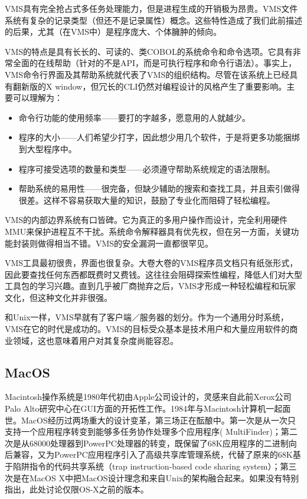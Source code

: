 \documentclass[12pt,oneside]{book}
\begin{document}
\begin{common-format}
VMS具有完全抢占式多任务处理能力，但是进程生成的开销极为昂贵。VMS文件系统有复杂的记录类型（但还不是记录属性）概念。这些特性造成了我们此前描述的后果，尤其（在VMS中）是程序庞大、个体臃肿的倾向。

VMS的特点是具有长长的、可读的、类COBOL的系统命令和命令选项。它具有非常全面的在线帮助（针对的不是API，而是可执行程序和命令行语法）。事实上，VMS命令行界面及其帮助系统就代表了VMS的组织结构。尽管在该系统上已经具有翻新版的X window，但冗长的CLI仍然对编程设计的风格产生了重要影响。主要可以理解为：

\begin{itemize}
\item 命令行功能的使用频率——要打的字越多，愿意用的人就越少。
\item 程序的大小——人们希望少打字，因此想少用几个软件，于是将更多功能捆绑到大型程序中。
\item 程序可接受选项的数量和类型——必须遵守帮助系统规定的语法限制。
\item 帮助系统的易用性——很完备，但缺少辅助的搜索和查找工具，并且索引做得很差。这样不容易获取大量的知识，鼓励了专业化而阻碍了轻松编程。
\end{itemize}

VMS的内部边界系统有口皆碑。它为真正的多用户操作而设计，完全利用硬件MMU来保护进程互不干扰。系统命令解释器具有优先权，但在另一方面，关键功能封装则做得相当不错。VMS的安全漏洞一直都很罕见。

VMS工具最初很贵，界面也很复杂。大卷大卷的VMS程序员文档只有纸张形式，因此要查找任何东西都既费时又费钱。这往往会阻碍探索性编程，降低人们对大型工具包的学习兴趣。直到几乎被厂商抛弃之后，VMS才形成一种轻松编程和玩家文化，但这种文化并非很强。

和Unix一样，VMS早就有了客户端／服务器的划分。作为一个通用分时系统，VMS在它的时代是成功的。VMS的目标受众基本是技术用户和大量应用软件的商业领域，这也意味着用户对其复杂度尚能容忍。


\subsection{MacOS}
Macintosh操作系统是1980年代初由Apple公司设计的，灵感来自此前Xerox公司Palo Alto研究中心在GUI方面的开拓性工作。1984年与Macintosh计算机一起面世。MacOS经历过两场重大的设计变革，第三场正在酝酿中。第一次是从一次只支持一个应用程序转变到能够多任务协作处理多个应用程序( MultiFinder)；第二次是从68000处理器到PowerPC处理器的转变，既保留了68K应用程序的二进制向后兼容，又为PowerPC应用程序引入了高级共享库管理系统，代替了原来的68K基于陷阱指令的代码共享系统（trap instruction-based code sharing system）；第三次是在MacOS X中把MacOS设计理念和来自Unix的架构融合起来。如果没有特别指出，此处讨论仅限OS-X之前的版本。


\end{common-format}
\end{document}
